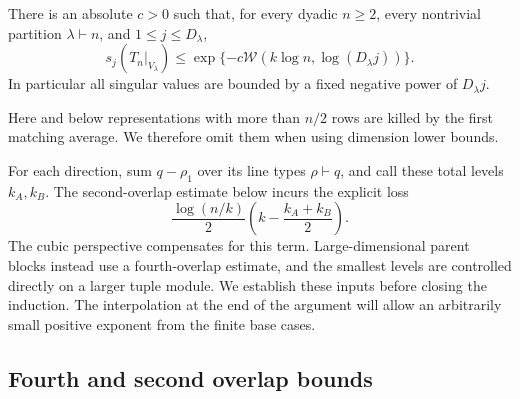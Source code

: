 \begin{theorem}\label{rec:perspective-singular}
There is an absolute $c>0$ such that, for every dyadic $n\ge2$,
every nontrivial partition $\lambda\vdash n$, and
$1\le j\le D_\lambda$,
\[
 s_j(T_n|_{V_\lambda})\le
       \exp\{-c\mathcal W(k\log n,\log(D_\lambda j))\}.
\]
In particular all singular values are bounded by a fixed negative power
of $D_\lambda j$.
\end{theorem}

Here and below representations with more than $n/2$ rows are killed by
the first matching average.  We therefore omit them when using dimension
lower bounds.

For each direction, sum $q-\rho_1$ over its line types
$\rho\vdash q$, and call these total levels $k_A,k_B$.
The second-overlap estimate below incurs the explicit loss
\[
 \frac{\log(n/k)}2\left(k-\frac{k_A+k_B}{2}\right).
\]
The cubic perspective compensates for this term. Large-dimensional
parent blocks instead use a fourth-overlap estimate, and the smallest
levels are controlled directly on a larger tuple module. We establish
these inputs before closing the induction. The interpolation at the
end of the argument will allow an arbitrarily small positive exponent
from the finite base cases.

\subsection{Fourth and second overlap bounds}

